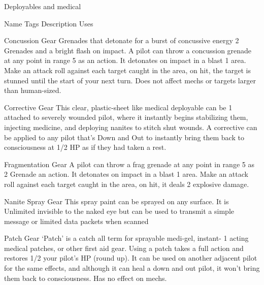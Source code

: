                                              Deployables and medical  

    Name                   Tags        Description                                                            Uses 

    Concussion             Gear        Grenades that detonate for a burst of concussive energy               2 
    Grenades                           and a bright flash on impact. A pilot can throw a  
                                       concussion grenade at any point in range 5 as an action.  
                                       It detonates on impact in a blast 1 area. Make an attack  
                                       roll against each target caught in the area, on hit, the  
                                       target is stunned until the start of your next turn. Does not  
                                       affect mechs or targets larger than human-sized. 

    Corrective             Gear       This clear, plastic-sheet like medical deployable can be                1 
                                       attached to severely wounded pilot, where it instantly  
                                       begins stabilizing them, injecting medicine, and deploying  
                                       nanites to stitch shut wounds. A corrective can be applied  
                                       to any pilot that’s Down and Out to instantly bring them  
                                       back to consciousness at 1/2 HP as if they had taken a  
                                       rest. 

   Fragmentation           Gear       A pilot can throw a frag grenade at any point in range 5 as            2 
    Grenade                            an action. It detonates on impact in a blast 1 area. Make  
                                       an attack roll against each target caught in the area, on  
                                       hit, it deals 2 explosive damage. 

   Nanite Spray            Gear       This spray paint can be sprayed on any surface. It is                   Unlimited 
                                       invisible to the naked eye but can be used to transmit a  
                                       simple message or limited data packets when scanned 

   Patch                   Gear        ‘Patch’ is a catch all term for sprayable medi-gel, instant-           1 
                                       acting medical patches, or other first aid gear. Using a  
                                       patch takes a full action and restores 1/2 your pilot’s HP  
                                       (round up). It can be used on another adjacent pilot for the  
                                       same effects, and although it can heal a down and out  
                                       pilot, it won’t bring them back to consciousness. Has no  
                                       effect on mechs. 

